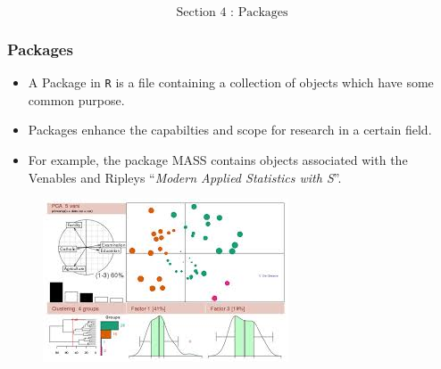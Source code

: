 \documentclass{beamer}
\begin{document}
 	\begin{frame}
 		\Huge
 		\[\mbox{ Section 4 : Packages } \]
 	\end{frame}
 	\begin{frame}
 		\frametitle{Packages}
 		
 		\begin{itemize}
 			\item A Package in \texttt{R} is a file containing a collection of objects which have some common purpose.
 			\item Packages enhance the capabilties and scope for research in a certain field. 
 			\item For example, the
 			package MASS contains objects associated with the Venables and Ripleys ``\textit{Modern Applied
 				Statistics with S}”. 
 		\end{itemize}
 		
 	\end{frame}
 	\begin{frame}
 		
 		
 		\begin{figure}
 			\centering
 			\includegraphics[width=0.97\linewidth]{CRAN}
 			
 		\end{figure}
 		
 		
 	\end{frame}
 	
\end{document}
